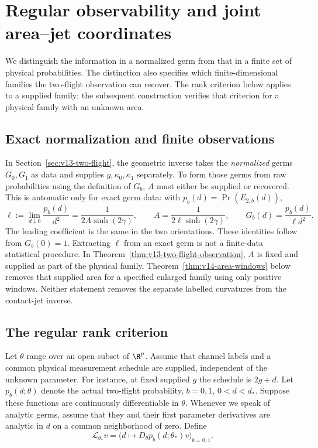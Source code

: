 \section{Regular observability and joint area--jet coordinates}
\label{sec:v14-observability}
We distinguish the information in a normalized germ from that in a
finite set of physical probabilities. The distinction also specifies
which finite-dimensional families the two-flight observation can
recover. The rank criterion below applies to a supplied family; the
subsequent construction verifies that criterion for a physical family
with an unknown area.

\subsection{Exact normalization and finite observations}
\label{sec:v14-normalization}
In Section~\ref{sec:v13-two-flight}, the geometric inverse takes the
\emph{normalized} germs $G_0,G_1$ as data and supplies
$g,\kappa_0,\kappa_1$ separately. To form those germs from raw
probabilities using the definition of $G_b$, $A$ must either be
supplied or recovered. This is automatic only for exact germ data:
with $p_b(d)=\Pr(E_{2,b}(d))$,
\begin{equation}\label{eq:v14-exact-area}
 \ell:=\lim_{d\downarrow0}\frac{p_b(d)}{d^2}
       =\frac{1}{2A\sinh(2\gamma)},\qquad
 A=\frac{1}{2\ell\sinh(2\gamma)},\qquad
 G_b(d)=\frac{p_b(d)}{\ell d^2}.
\end{equation}
The leading coefficient is the same in the two orientations. These
identities follow from $G_b(0)=1$. Extracting $\ell$ from an exact
germ is not a finite-data statistical procedure. In
Theorem~\ref{thm:v13-two-flight-observation}, $A$ is fixed and supplied
as part of the physical family. Theorem~\ref{thm:v14-area-windows}
below removes that supplied area for a specified enlarged family using
only positive windows. Neither statement removes the separate labelled
curvatures from the contact-jet inverse.

\subsection{The regular rank criterion}
Let $\theta$ range over an open subset of $\R^p$. Assume that channel
labels and a common physical measurement schedule are supplied,
independent of the unknown parameter. For instance, at fixed supplied
$g$ the schedule is $2g+d$. Let $p_b(d;\theta)$ denote the actual
two-flight probability, $b=0,1$, $0<d<d_*$. Suppose these functions
are continuously differentiable in $\theta$. Whenever we speak of
analytic germs, assume that they and their first parameter derivatives
are analytic in $d$ on a common neighborhood of zero. Define
\begin{equation}\label{eq:v14-tangent-observation}
 \mathcal L_{\theta_*}v=
 \bigl(d\mapsto D_\theta p_b(d;\theta_*)v\bigr)_{b=0,1}.
\end{equation}

